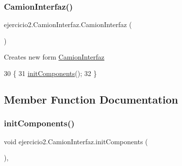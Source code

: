 \subsubsection{\texorpdfstring{Camion\+Interfaz()}{CamionInterfaz()}}
{\footnotesize\ttfamily ejercicio2.\+Camion\+Interfaz.\+Camion\+Interfaz (\begin{DoxyParamCaption}{ }\end{DoxyParamCaption})\hspace{0.3cm}{\ttfamily [inline]}}

Creates new form \mbox{\hyperlink{classejercicio2_1_1_camion_interfaz}{Camion\+Interfaz}} 
\begin{DoxyCode}
30                             \{
31         \mbox{\hyperlink{classejercicio2_1_1_camion_interfaz_aa48968cf36e25fbb1780655fae1e772c}{initComponents}}();
32     \}
\end{DoxyCode}


\subsection{Member Function Documentation}
\mbox{\label{classejercicio2_1_1_camion_interfaz_aa48968cf36e25fbb1780655fae1e772c}} 
\subsubsection{\texorpdfstring{init\+Components()}{initComponents()}}
{\footnotesize\ttfamily void ejercicio2.\+Camion\+Interfaz.\+init\+Components (\begin{DoxyParamCaption}{ }\end{DoxyParamCaption})\hspace{0.3cm}{\ttfamily [inline]}, {\ttfamily [private]}}

